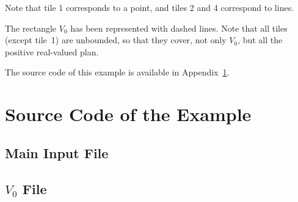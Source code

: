 \documentclass[a4paper,11pt]{report}
\newcommand{\IncludeIMIfile}[1]{
	\lstset{language=Imitator}
	
}
\begin{document}
Note that tile 1 corresponds to a point, and tiles 2 and 4 correspond to lines.

The rectangle $V_0$ has been represented with dashed lines.
Note that all tiles (except tile~1) are unbounded, so that they cover, not only $V_0$, but all the positive real-valued plan.


The source code of this example is available in Appendix~\ref{app:source}.



\newpage

\appendix

\chapter{Source Code of the Example} \label{app:source}

\section{Main Input File}

\IncludeIMIfile{include/SRlatch.imi}



\section{$V_0$ File}

\IncludeIMIfile{include/SRlatch.v0}



\fi
\end{document}
